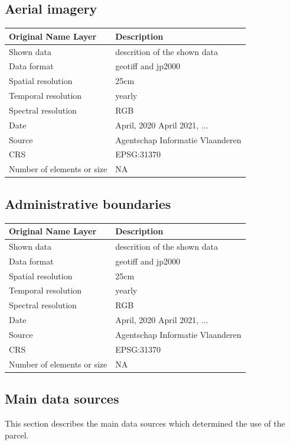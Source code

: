 \subsection{Aerial imagery}
\begin{tabular}{l|l}
    \hline
    \textbf{Original Name Layer} & \textbf{Description} \\
    \hline
    Shown data & descrition of the shown data \\
    \hline
    Data format & geotiff and jp2000 \\
    \hline
    Spatial resolution & 25cm \\
    \hline
    Temporal resolution & yearly \\
    \hline
    Spectral resolution & RGB \\
    \hline
    Date & April, 2020 \- April 2021, ... \\
    \hline
    Source & Agentschap Informatie Vlaanderen \\
    \hline
    CRS & EPSG:31370 \\
    \hline
    Number of elements or size & NA \\
    \hline
\end{tabular}

\subsection{Administrative boundaries}
\begin{tabular}{l|l}
    \hline
    \textbf{Original Name Layer} & \textbf{Description} \\
    \hline
    Shown data & descrition of the shown data \\
    \hline
    Data format & geotiff and jp2000 \\
    \hline
    Spatial resolution & 25cm \\
    \hline
    Temporal resolution & yearly \\
    \hline
    Spectral resolution & RGB \\
    \hline
    Date & April, 2020 \- April 2021, ... \\
    \hline
    Source & Agentschap Informatie Vlaanderen \\
    \hline
    CRS & EPSG:31370 \\
    \hline
    Number of elements or size & NA \\
    \hline
\end{tabular}


\subsection{Main data sources}
This section describes the main data sources which determined the use of the parcel.

